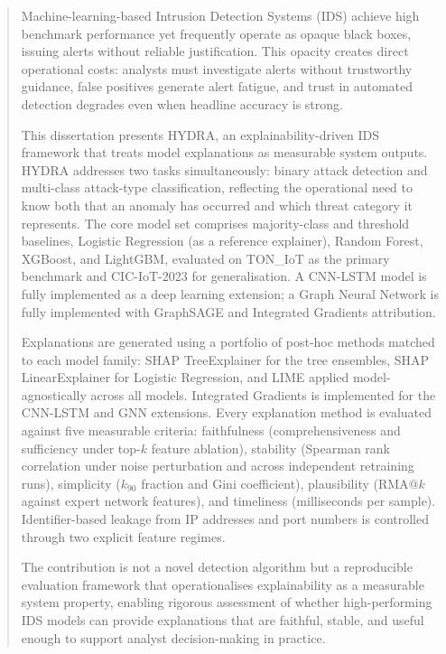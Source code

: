 \documentclass[12pt,a4paper]{report}
\begin{document}
\newpage
\begin{abstract}
Machine-learning-based Intrusion Detection Systems (IDS) achieve high benchmark performance yet frequently operate as opaque black boxes, issuing alerts without reliable justification. This opacity creates direct operational costs: analysts must investigate alerts without trustworthy guidance, false positives generate alert fatigue, and trust in automated detection degrades even when headline accuracy is strong.

This dissertation presents HYDRA, an explainability-driven IDS framework that treats model explanations as measurable system outputs. HYDRA addresses two tasks simultaneously: binary attack detection and multi-class attack-type classification, reflecting the operational need to know both that an anomaly has occurred and which threat category it represents. The core model set comprises majority-class and threshold baselines, Logistic Regression (as a reference explainer), Random Forest, XGBoost, and LightGBM, evaluated on TON\_IoT as the primary benchmark and CIC-IoT-2023 for generalisation. A CNN-LSTM model is fully implemented as a deep learning extension; a Graph Neural Network is fully implemented with GraphSAGE and Integrated Gradients attribution.

Explanations are generated using a portfolio of post-hoc methods matched to each model family: SHAP TreeExplainer for the tree ensembles, SHAP LinearExplainer for Logistic Regression, and LIME applied model-agnostically across all models. Integrated Gradients is implemented for the CNN-LSTM and GNN extensions. Every explanation method is evaluated against five measurable criteria: faithfulness (comprehensiveness and sufficiency under top-$k$ feature ablation), stability (Spearman rank correlation under noise perturbation and across independent retraining runs), simplicity ($k_{90}$ fraction and Gini coefficient), plausibility (RMA@$k$ against expert network features), and timeliness (milliseconds per sample). Identifier-based leakage from IP addresses and port numbers is controlled through two explicit feature regimes.

The contribution is not a novel detection algorithm but a reproducible evaluation framework that operationalises explainability as a measurable system property, enabling rigorous assessment of whether high-performing IDS models can provide explanations that are faithful, stable, and useful enough to support analyst decision-making in practice.
\end{abstract}
\end{document}
